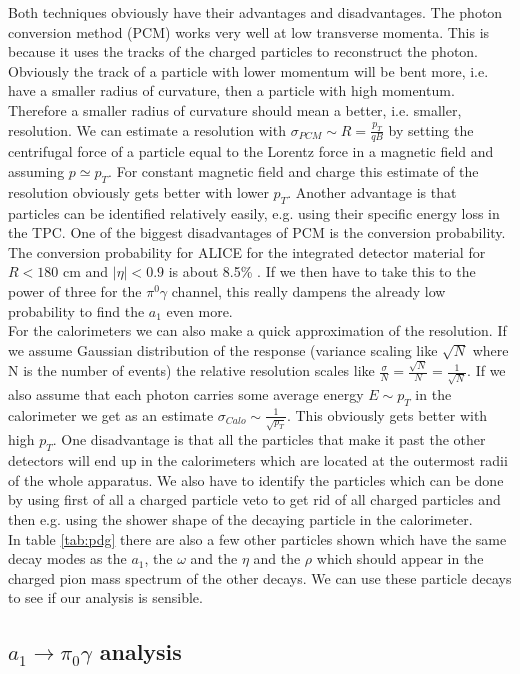 Both techniques obviously have their advantages and disadvantages. The photon conversion method (PCM) works very well at low transverse momenta. This is because it uses the tracks of the charged particles to reconstruct the photon. Obviously the track of a particle with lower momentum will be bent more, i.e. have a smaller radius of curvature, then a particle with high momentum. Therefore a smaller radius of curvature should mean a better, i.e. smaller, resolution. We can estimate a resolution with $\sigma_{PCM} \sim R = \frac{p_T}{qB}$ by setting the centrifugal force of a particle equal to the Lorentz force in a magnetic field and assuming $p \simeq p_T$. For constant magnetic field and charge this estimate of the resolution obviously gets better with lower $p_T$. Another advantage is that particles can be identified relatively easily, e.g. using their specific energy loss in the TPC. One of the biggest disadvantages of PCM is the conversion probability. The conversion probability for ALICE for the integrated detector material for $R<180$ cm and $|\eta|<0.9$ is about 8.5\% \cite{ALICEPerfRep}. If we then have to take this to the power of three for the $\pi^0\gamma$ channel, this really dampens the already low probability to find the $a_1$ even more. \\
For the calorimeters we can also make a quick approximation of the resolution. If we assume Gaussian distribution of the response (variance scaling like $\sqrt{N}$ where N is the number of events) the relative resolution scales like $\frac{\sigma}{N} = \frac{\sqrt{N}}{N} = \frac{1}{\sqrt{N}}$. If we also assume that each photon carries some average energy $E \sim p_T$ in the calorimeter we get as an estimate $\sigma_{Calo} \sim \frac{1}{\sqrt{p_T}}$. This obviously gets better with high $p_T$. One disadvantage is that all the particles that make it past the other detectors will end up in the calorimeters which are located at the outermost radii of the whole apparatus. We also have to identify the particles which can be done by using first of all a charged particle veto to get rid of all charged particles and then e.g. using the shower shape of the  decaying particle in the calorimeter. \\
In table \ref{tab:pdg} there are also a few other particles shown which have the same decay modes as the $a_1$, the $\omega$ and the $\eta$ and the $\rho$ which should appear in the charged pion mass spectrum of the other decays. We can use these particle decays to see if our analysis is sensible.

\subsection{$a_1 \rightarrow \pi_0 \gamma$ analysis}
